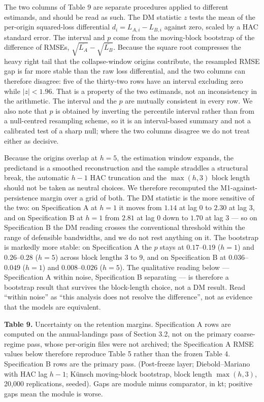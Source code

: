\documentclass[11pt]{article}
\begin{document}
The two columns of Table 9 are separate procedures applied to different
estimands, and should be read as such. The DM statistic \(z\) tests the
mean of the per-origin squared-loss differential
\(d_i = L_{A,i} - L_{B,i}\) against zero, scaled by a HAC standard error.
The interval and \(p\) come from the moving-block bootstrap of the
difference of RMSEs, \(\sqrt{\overline{L_A}} - \sqrt{\overline{L_B}}\).
Because the square root compresses the heavy right tail that the
collapse-window origins contribute, the resampled RMSE gap is far more
stable than the raw loss differential, and the two columns can therefore
disagree: five of the thirty-two rows have an interval excluding zero
while \(|z| < 1.96\). That is a property of the two estimands, not an
inconsistency in the arithmetic. The interval and the \(p\) are mutually
consistent in every row. We also note that \(p\) is obtained by
inverting the percentile interval rather than from a null-centred
resampling scheme, so it is an interval-based summary and not a
calibrated test of a sharp null; where the two columns disagree we do
not treat either as decisive.

Because the origins overlap at \(h=5\), the estimation window expands,
the predictand is a smoothed reconstruction and the sample straddles a
structural break, the automatic \(h-1\) HAC truncation and the
\(\max(h,3)\) block length should not be taken as neutral choices. We
therefore recomputed the M1-against-persistence margin over a grid of
both. The DM statistic is the more sensitive of the two: on
Specification A at \(h=1\) it moves from \(1.14\) at lag \(0\) to
\(2.30\) at lag \(3\), and on Specification B at \(h=1\) from
\(2.81\) at lag \(0\) down to \(1.70\) at lag \(3\) --- so on
Specification B the DM reading crosses the conventional threshold within
the range of defensible bandwidths, and we do not rest anything on it.
The bootstrap is markedly more stable: on Specification A the \(p\)
stays at \(0.17\)--\(0.19\) (\(h=1\)) and \(0.26\)--\(0.28\)
(\(h=5\)) across block lengths \(3\) to \(9\), and on Specification B
at \(0.036\)--\(0.049\) (\(h=1\)) and \(0.008\)--\(0.026\)
(\(h=5\)). The qualitative reading below --- Specification A within
noise, Specification B separating --- is therefore a bootstrap result
that survives the block-length choice, not a DM result. Read
``within noise'' as ``this analysis does not resolve the difference'',
not as evidence that the models are equivalent.

\textbf{Table 9.} Uncertainty on the retention margins. Specification A
rows are computed on the annual-landings pass of Section 3.2, not on the
primary coarse-regime pass, whose per-origin files were not archived;
the Specification A RMSE values below therefore reproduce Table 5 rather
than the frozen Table 4. Specification B rows are the primary pass.
(Post-freeze layer; Diebold--Mariano with HAC lag \(h-1\); K\"unsch moving-block
bootstrap, block length \(\max(h,3)\), 20,000 replications, seeded).
Gaps are module minus comparator, in kt; positive gaps mean the module
is worse.
\end{document}

